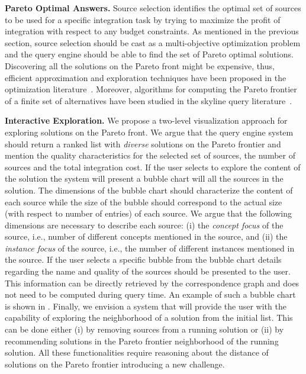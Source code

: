 \documentclass{sig-alternate}
\begin{document}
\vspace{3pt}\noindent\textbf{Pareto Optimal Answers.} Source selection identifies the optimal set of sources to be used for a specific integration task by trying to maximize the profit of integration with respect to any budget constraints. As mentioned in the previous section, source selection should be cast as a multi-objective optimization problem and the query engine should be able to find the set of Pareto optimal solutions. Discovering all the solutions on the Pareto front might be expensive, thus, efficient approximation and exploration techniques have been proposed in the optimization literature~\cite{wilson:2001}. Moreover, algorithms for computing the Pareto frontier of a finite set of alternatives have been studied in the skyline query literature~\cite{godfrey:2007,kossmann:2002}. 

\vspace{3pt}\noindent\textbf{Interactive Exploration.} We propose a two-level visualization approach for exploring solutions on the Pareto front.  We argue that the query engine system should return a ranked list with {\em diverse} solutions on the Pareto frontier and mention the quality characteristics for the selected set of sources, the number of sources and the total integration cost. If the user selects to explore the content of the solution the system will present a bubble chart will all the sources in the solution. The dimensions of the bubble chart should characterize the content of each source while the size of the bubble should correspond to the actual size (with respect to number of entries) of each source. We argue that the following dimensions are necessary to describe each source: (i) the {\em concept focus} of the source, i.e., number of different concepts mentioned in the source, and (ii) the {\em instance focus} of the source, i.e., the number of different instances mentioned in the source. If the user selects a specific bubble from the bubble chart details regarding the name and quality of the sources should be presented to the user. This information can be directly retrieved by the correspondence graph and does not need to be computed during query time. An example of such a bubble chart is shown in . Finally, we envision a system that will provide the user with the capability of exploring the neighborhood of a solution from the initial list. This can be done either (i) by removing sources from a running solution or (ii) by recommending solutions in the Pareto frontier neighborhood of the running solution. All these functionalities require reasoning about the distance of solutions on the Pareto frontier introducing a new challenge.
\end{document}
